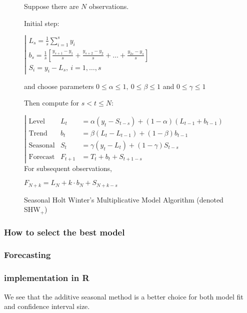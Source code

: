 \begin{figure}
\begin{tcolorbox}[width=.6\textwidth]%

Suppose there are $N$ observations.

Initial step:

$\left|\begin{array}{l}
L_s = \frac1s \sum_{i=1}^s y_i \\
b_s = \frac1s \left[\frac{y_{s+1}-y_1}{s}+\frac{y_{s+2}-y_2}{s}+\dots+\frac{y_{2s}-y_s}{s}\right]\\
S_i  = y_i-L_s, \ i=1,\dots,s
\end{array}\right.$

and choose parameters $0\leq\alpha\leq1,\ 0\leq\beta\leq1$ and $0\leq\gamma\leq1$

Then compute for $s<t\leq N$:

$\left|\begin{array}{lll}
\text{Level} &       L_t & = \alpha (y_t-S_{t-s})+(1-\alpha)(L_{t-1}+b_{t-1})\\
\text{Trend} &      b_t & = \beta(L_t-L_{t-1})+(1-\beta)b_{t-1}\\
\text{Seasonal} & S_t & = \gamma (y_t-L_t) + (1-\gamma)S_{t-s}\\
\text{Forecast} & F_{t+1} & = T_t+b_t+S_{t+1-s}
\end{array}\right.$
For subsequent observations,

$F_{N+k}=L_N+k\cdot b_N+S_{N+k-s}$
\label{SHWx}
\end{tcolorbox}
\caption{Seasonal Holt Winter’s Multiplicative Model Algorithm (denoted SHW$_{+}$)}
\end{figure}


\subsubsection{How to select the best model}

\subsubsection{Forecasting}

\subsubsection{implementation in R}


We see that the additive seasonal method is a better choice for both model fit and confidence interval size.

